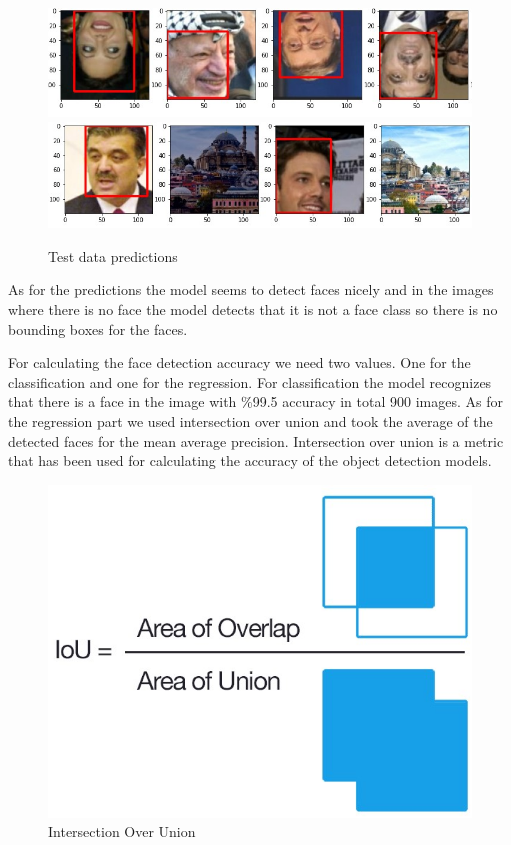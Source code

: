 \documentclass[conference]{IEEEtran}
\begin{document}
\begin{figure}[htbp]
\centering
\includegraphics[scale=0.45]{pred1.jpg}
\includegraphics[scale=0.45]{pred2.jpg}
\caption{Test data predictions}
\label{fig:Predictions}
\end{figure}

\bigskip

As for the predictions the model seems to detect faces nicely and in the images where there is no face the model detects that it is not a face class so there is no bounding boxes for the faces. 

\bigskip

For calculating the face detection accuracy we need two values. One for the classification and one for the regression. For classification the model recognizes that there is a face in the image with \%99.5 accuracy in total 900 images. As for the regression part we used intersection over union and took the average of the detected faces for the mean average precision. Intersection over union is a metric that has been used for calculating the accuracy of the object detection models. 

\begin{figure}[htbp]
\centering
\includegraphics[scale=0.50]{Iou.jpg}
\caption{Intersection Over Union}
\label{fig:IoU}
\end{figure}
\end{document}
